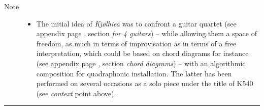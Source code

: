 \begin{description}
\newpage
\item[Note] \hfill 
\begin{itemize}
\item[]  The initial idea of \textsl{Kj{\o}lhiea} was to confront a guitar quartet (see appendix page \pageref{kjccqg}, section \textsl{for 4 guitars}) -- while allowing them a space of freedom, as much in terms of improvisation as in terms of a free interpretation, which could be based on chord diagrams for instance (see appendix page \pageref{kjcccc}, section \textsl{chord diagrams}) -- with an algorithmic composition for quadraphonic installation. The latter has been performed on several occasions as a solo piece under the title of K540 (see \textsl{context} point above).
\end{itemize}

\end{description}


\bigskip

\begin{center}\rule{0.5\linewidth}{0.5pt}\end{center}

\bigskip

